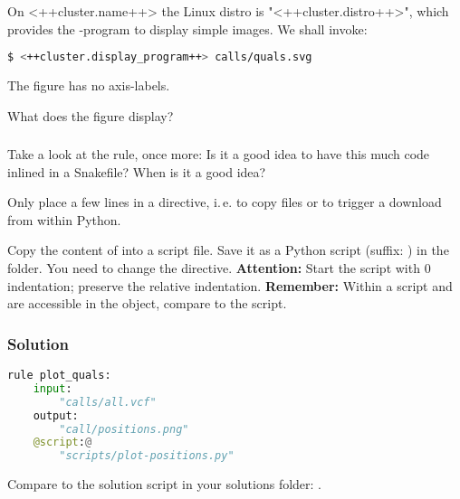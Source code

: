 \begin{frame}[fragile]
	\frametitle{}
	On <++cluster.name++> the Linux distro is "<++cluster.distro++>", which \newline provides the -program to display simple images. We shall invoke:
	\begin{lstlisting}[language=Bash, style=Shell]
$ <++cluster.display_program++> calls/quals.svg
	\end{lstlisting}
	The figure has no axis-labels.
	\begin{question}
		What does the figure display?
	\end{question}
\end{frame}

\begin{frame}[fragile]
	\frametitle{}
	\footnotesize
	\begin{question}
		Take a look at the  rule, once more: Is it a good idea to have this much code inlined in a Snakefile? When is it a good idea?
	\end{question}
	\pause
	\begin{docs}
		Only place a few lines in a  directive, i.\,e. to copy files or to trigger a download from within Python.
	\end{docs}
	\pause
	\begin{task}
		Copy the content of  into a script file. Save it as a Python script (suffix: ) in the  folder. You need to change the  directive.\newline
		\textbf{Attention:} Start the script with 0 indentation; preserve the relative indentation.\newline
		\textbf{Remember:} Within a script  and  are accessible in the  object, compare to the  script.
	\end{task}
\end{frame}

\begin{frame}[fragile]
	\frametitle{Solution}
	\begin{lstlisting}[language=Python,style=Python]
rule plot_quals:
    input:
        "calls/all.vcf"
    output:
        "call/positions.png"
    @script:@
        "scripts/plot-positions.py"
	\end{lstlisting}
	Compare to the solution script in your solutions folder: .
\end{frame}

